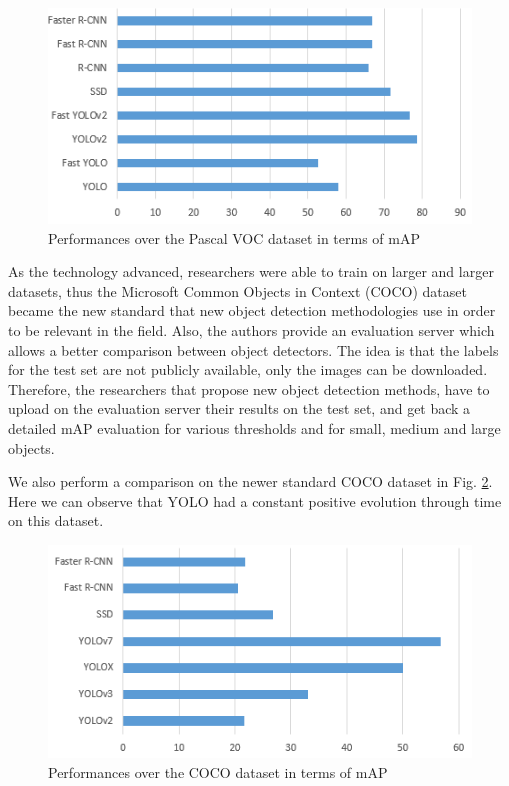 \begin{figure}[!h]
  \centering
  \includegraphics[scale=\scalevar]{images/pascal.png}
  \caption{Performances over the Pascal VOC dataset in terms of mAP}
  \label{pascal}
\end{figure}

As the technology advanced, researchers were able to train on larger and larger datasets, thus the Microsoft Common Objects in Context (COCO) dataset \cite{coco} became the new standard that new object detection methodologies use in order to be relevant in the field. Also, the authors provide an evaluation server which allows a better comparison between object detectors. The idea is that the labels for the test set are not publicly available, only the images can be downloaded. Therefore, the researchers that propose new object detection methods, have to upload on the evaluation server their results on the test set, and get back a detailed mAP evaluation for various thresholds and for small, medium and large objects.

We also perform a comparison on the newer standard COCO dataset in Fig. \ref{coco}. Here we can observe that YOLO had a constant positive evolution through time on this dataset.

\begin{figure}[!h]
  \centering
  \includegraphics[scale=\scalevar]{images/coco.png}
  \caption{Performances over the COCO dataset in terms of mAP}
  \label{coco}
\end{figure}


